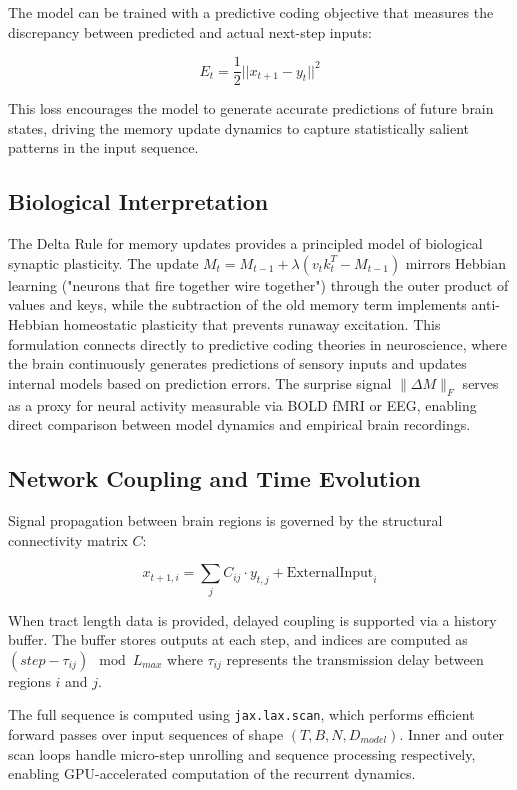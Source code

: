 The model can be trained with a predictive coding objective that measures the discrepancy between predicted and actual next-step inputs:

\begin{equation}
	E_t = \frac{1}{2} || x_{t+1} - y_t ||^2
\end{equation}

This loss encourages the model to generate accurate predictions of future brain states, driving the memory update dynamics to capture statistically salient patterns in the input sequence.

\subsection{Biological Interpretation}

The Delta Rule for memory updates provides a principled model of biological synaptic plasticity. The update $M_t = M_{t-1} + \lambda(v_t k_t^T - M_{t-1})$ mirrors Hebbian learning ("neurons that fire together wire together") through the outer product of values and keys, while the subtraction of the old memory term implements anti-Hebbian homeostatic plasticity that prevents runaway excitation. This formulation connects directly to predictive coding theories in neuroscience, where the brain continuously generates predictions of sensory inputs and updates internal models based on prediction errors. The surprise signal $\| \Delta M \|_F$ serves as a proxy for neural activity measurable via BOLD fMRI or EEG, enabling direct comparison between model dynamics and empirical brain recordings.

\subsection{Network Coupling and Time Evolution}

Signal propagation between brain regions is governed by the structural connectivity matrix $C$:

\begin{equation}
	x_{t+1, i} = \sum_j C_{ij} \cdot y_{t,j} + \text{ExternalInput}_i
\end{equation}

When tract length data is provided, delayed coupling is supported via a history buffer. The buffer stores outputs at each step, and indices are computed as $(step - \tau_{ij}) \mod L_{max}$ where $\tau_{ij}$ represents the transmission delay between regions $i$ and $j$.

The full sequence is computed using \texttt{jax.lax.scan}, which performs efficient forward passes over input sequences of shape $(T, B, N, D_{model})$. Inner and outer scan loops handle micro-step unrolling and sequence processing respectively, enabling GPU-accelerated computation of the recurrent dynamics.


